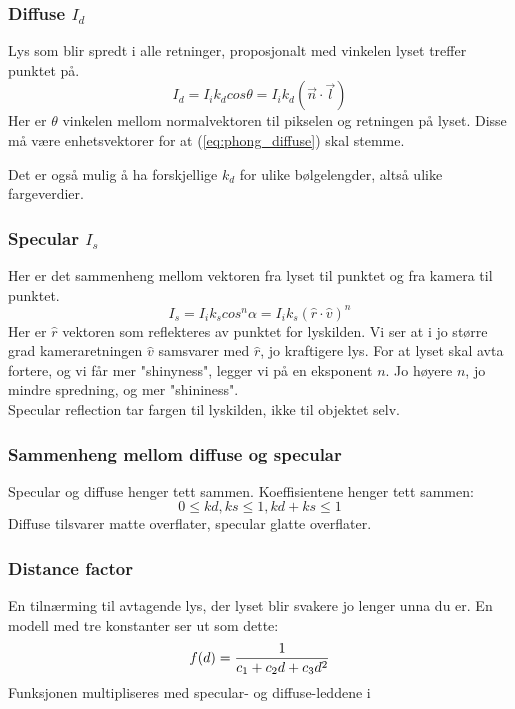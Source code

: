 \subsubsection{Diffuse $I_d$}
Lys som blir spredt i alle retninger, proposjonalt med vinkelen lyset treffer punktet på.
\begin{equation} \label{eq:phong_diffuse}
    I_d = I_ik_dcos\theta = I_ik_d(\vec{n}\cdot\vec{l})
\end{equation}
Her er $\theta$ vinkelen mellom normalvektoren til pikselen og retningen på lyset. Disse må være enhetsvektorer for at (\ref{eq:phong_diffuse}) skal stemme.

Det er også mulig å ha forskjellige $k_d$ for ulike bølgelengder, altså ulike fargeverdier.

\subsubsection{Specular $I_s$}
Her er det sammenheng mellom vektoren fra lyset til punktet og fra kamera til punktet.
\begin{equation}
    I_s = I_ik_s cos^n\alpha = I_ik_s(\hat r\cdot \hat v)^n
\end{equation}
Her er $\hat r$ vektoren som reflekteres av punktet for lyskilden. Vi ser at i jo større grad kameraretningen $\hat v$ samsvarer med $\hat r$, jo kraftigere lys. For at lyset skal avta fortere, og vi får mer "shinyness", legger vi på en eksponent $n$. Jo høyere $n$, jo mindre spredning, og mer "shininess".\\
Specular reflection tar fargen til lyskilden, ikke til objektet selv.

\subsubsection{Sammenheng mellom diffuse og specular}
Specular og diffuse henger tett sammen. Koeffisientene henger tett sammen:
\begin{equation}
    0 \le kd,ks \le 1, kd + ks \le 1
\end{equation}
Diffuse tilsvarer matte overflater, specular glatte overflater.

\subsubsection{Distance factor}
En tilnærming til avtagende lys, der lyset blir svakere jo lenger unna du er. En modell med tre konstanter ser ut som dette:
\begin{equation}
    f(d) = {1 \over c_1 + c_2d + c_3d^2}
\end{equation}
Funksjonen multipliseres med specular- og diffuse-leddene i 

